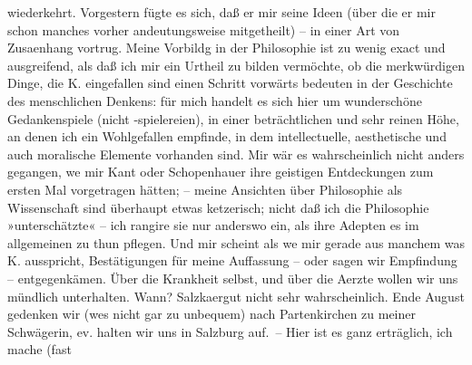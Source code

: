               wiederkehrt. Vorgestern fügte es sich, daß er mir seine Ideen (über die er mir schon
               manches vorher andeutungsweise mitgetheilt) – in einer Art von Zusa{\geminationm}enhang vortrug. Meine \strikeout{\textcolor{gray}{×}\-\textcolor{gray}{×}\-\textcolor{gray}{×}\-\textcolor{gray}{×}\-\textcolor{gray}{×}} Vorbildg in der Philosophie \introOben{}ist\introOben{} zu wenig exact und
               ausgreifend, als daß ich mir ein Urtheil zu bilden vermöchte, ob die merkwürdigen
               Dinge, die K. eingefallen sind einen Schritt
               vorwärts bedeuten in der Geschichte des menschlichen Denkens: für mich handelt es
               sich hier um wunderschöne Gedankenspiele (nicht -spielereien), in einer
               beträchtlichen und sehr reinen Höhe, an denen ich ein Wohlgefallen empfinde, in dem
                   intellectuelle, aesthetische und auch moralische
               Elemente vorhanden sind. Mir wär es wahrscheinlich nicht anders gegangen, we{\geminationn} mir Kant oder
                  Schopenhauer ihre geistigen Entdeckungen zum
               ersten Mal vorgetragen hätten; – meine Ansichten über Philosophie als Wissenschaft
                  {\pb}sind überhaupt etwas ketzerisch; nicht daß ich die
               Philosophie »unterschätzte« – ich rangire sie nur anderswo ein, als ihre Adepten es
               im allgemeinen zu thun pflegen. Und mir scheint als we{\geminationn}
               mir gerade aus manchem was K. ausspricht,
               Bestätigungen für meine Auffassung – oder sagen wir Empfindung – entgegenkämen. Über
               die Krankheit selbst, und über die Aerzte wollen wir uns mündlich unterhalten. Wann?
                  Salzka{\geminationm}ergut
               nicht sehr wahrscheinlich. Ende August gedenken wir (we{\geminationn}s nicht gar zu unbequem) nach Partenkirchen zu meiner Schwägerin, ev. halten wir uns in Salzburg auf. – Hier ist es ganz erträglich, ich mache (fast
